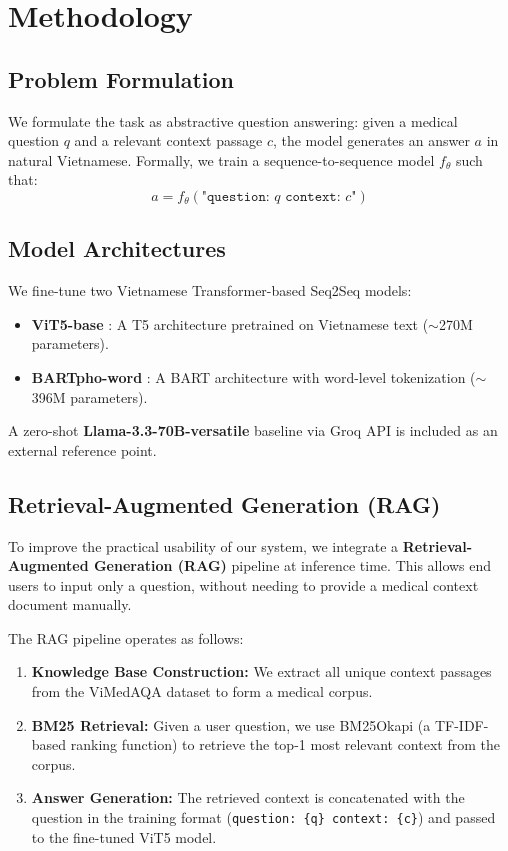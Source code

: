 \section{Methodology}

\subsection{Problem Formulation}
We formulate the task as abstractive question answering: given a medical question $q$ and a relevant context passage $c$, the model generates an answer $a$ in natural Vietnamese. Formally, we train a sequence-to-sequence model $f_\theta$ such that:
\begin{equation}
  a = f_\theta(\texttt{"question: } q \texttt{ context: } c\texttt{"})
\end{equation}

\subsection{Model Architectures}
We fine-tune two Vietnamese Transformer-based Seq2Seq models:
\begin{itemize}
  \item \textbf{ViT5-base} \cite{phan-etal-2022-vit5}: A T5 architecture pretrained on Vietnamese text ($\sim$270M parameters).
  \item \textbf{BARTpho-word} \cite{tran-etal-2021-bartpho}: A BART architecture with word-level tokenization ($\sim$396M parameters).
\end{itemize}
A zero-shot \textbf{Llama-3.3-70B-versatile} baseline via Groq API is included as an external reference point.

\subsection{Retrieval-Augmented Generation (RAG)}
\label{sec:rag}
To improve the practical usability of our system, we integrate a \textbf{Retrieval-Augmented Generation (RAG)} pipeline at inference time. This allows end users to input only a question, without needing to provide a medical context document manually.

The RAG pipeline operates as follows:
\begin{enumerate}
  \item \textbf{Knowledge Base Construction:} We extract all unique context passages from the ViMedAQA dataset to form a medical corpus.
  \item \textbf{BM25 Retrieval:} Given a user question, we use BM25Okapi (a TF-IDF-based ranking function) to retrieve the top-1 most relevant context from the corpus.
  \item \textbf{Answer Generation:} The retrieved context is concatenated with the question in the training format (\texttt{question: \{q\} context: \{c\}}) and passed to the fine-tuned ViT5 model.
\end{enumerate}

